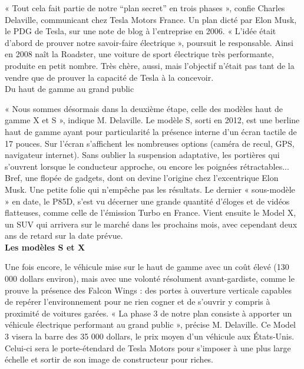 \documentclass[8pt]{article}
\begin{document}
« Tout cela fait partie de notre “plan secret” en trois phases », confie Charles Delaville, communicant chez Tesla Motors France. Un plan dicté par Elon Musk, le PDG de Tesla, sur une note de blog à l’entreprise en 2006. « L’idée était d’abord de prouver notre savoir-faire électrique », poursuit le responsable. Ainsi en 2008 naît la Roadster, une voiture de sport électrique très performante, produite en petit nombre. Très chère, aussi, mais l’objectif n’était pas tant de la vendre que de prouver la capacité de Tesla à la concevoir. \\

Du haut de gamme au grand public

« Nous sommes désormais dans la deuxième étape, celle des modèles haut de gamme X et S », indique M. Delaville. Le modèle S, sorti en 2012, est une berline haut de gamme ayant pour particularité la présence interne d’un écran tactile de 17 pouces. Sur l’écran s’affichent les nombreuses options (caméra de recul, GPS, navigateur internet). Sans oublier la suspension adaptative, les portières qui s’ouvrent lorsque le conducteur approche, ou encore les poignées rétractables... \\

Bref, une flopée de gadgets, dont on devine l’origine chez l’excentrique Elon Musk. Une petite folie qui n’empêche pas les résultats. Le dernier « sous-modèle » en date, le P85D, s’est vu décerner une grande quantité d’éloges et de vidéos flatteuses, comme celle de l’émission Turbo en France. Vient ensuite le Model X, un SUV qui arrivera sur le marché dans les prochains mois, avec cependant deux ans de retard sur la date prévue. \\

\textbf{Les modèles S et X}

Une fois encore, le véhicule mise sur le haut de gamme avec un coût élevé (130 000 dollars environ), mais avec une volonté résolument avant-gardiste, comme le prouve la présence des Falcon Wings : des portes à ouverture verticale capables de repérer l’environnement pour ne rien cogner et de s’ouvrir y compris à proximité de voitures garées. « La phase 3 de notre plan consiste à apporter un véhicule électrique performant au grand public », précise M. Delaville. Ce Model 3 visera la barre des 35 000 dollars, le prix moyen d’un véhicule aux États-Unis. Celui-ci sera le porte-étendard de Tesla Motors pour s’imposer à une plus large échelle et sortir de son image de constructeur pour riches. \\
\end{document}
